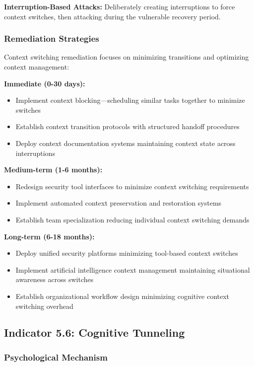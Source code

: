 \documentclass[11pt,a4paper]{article}
\begin{document}
\textbf{Interruption-Based Attacks:} Deliberately creating interruptions to force context switches, then attacking during the vulnerable recovery period.

\subsubsection{Remediation Strategies}

Context switching remediation focuses on minimizing transitions and optimizing context management:

\textbf{Immediate (0-30 days):}
\begin{itemize}
\item Implement context blocking---scheduling similar tasks together to minimize switches
\item Establish context transition protocols with structured handoff procedures
\item Deploy context documentation systems maintaining context state across interruptions
\end{itemize}

\textbf{Medium-term (1-6 months):}
\begin{itemize}
\item Redesign security tool interfaces to minimize context switching requirements
\item Implement automated context preservation and restoration systems
\item Establish team specialization reducing individual context switching demands
\end{itemize}

\textbf{Long-term (6-18 months):}
\begin{itemize}
\item Deploy unified security platforms minimizing tool-based context switches
\item Implement artificial intelligence context management maintaining situational awareness across switches
\item Establish organizational workflow design minimizing cognitive context switching overhead
\end{itemize}

\subsection{Indicator 5.6: Cognitive Tunneling}

\subsubsection{Psychological Mechanism}
\end{document}
